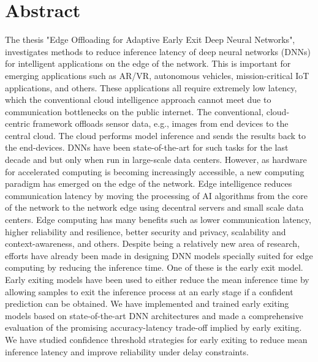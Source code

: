 
\hypertarget{abstract}{%
	\chapter*{Abstract}\label{sec:abstract}}
\begin{justify}
	\begin{small}
		{\textcolor{caption-color}{The thesis "Edge Offloading for Adaptive Early Exit Deep Neural Networks", investigates methods to reduce inference latency of deep neural networks (DNNs) for intelligent applications on the edge of the network. This is important for emerging applications such as AR/VR, autonomous vehicles, mission-critical IoT applications, and others. These applications all require extremely low latency, which the conventional cloud intelligence approach cannot meet due to communication bottlenecks on the public internet. \newline
				The conventional, cloud-centric framework offloads sensor data, e.g., images from end devices to the central cloud. The cloud performs model inference and sends the results back to the end-devices. DNNs have been state-of-the-art for such tasks for the last decade and but only when run in large-scale data centers. However, as hardware for accelerated computing is becoming increasingly accessible, a new computing paradigm has emerged on the edge of the network.
				\newline Edge intelligence reduces communication latency by moving the processing of AI algorithms from the core of the network to the network edge using decentral servers and small scale data centers. Edge computing has many benefits such as lower communication latency, higher reliability and resilience, better security and privacy, scalability and context-awareness, and others. Despite being a relatively new area of research, efforts have already been made in designing DNN models specially suited for edge computing by reducing the inference time. One of these is the early exit model. 
				\newline Early exiting models have been used to either reduce the mean inference time by allowing samples to exit the inference process at an early stage if a confident prediction can be obtained. We have implemented and trained early exiting models based on state-of-the-art DNN architectures and made a comprehensive evaluation of the promising accuracy-latency trade-off implied by early exiting. We have studied confidence threshold strategies for early exiting to reduce mean inference latency and improve reliability under delay constraints.
}}
\end{small}
\end{justify}
